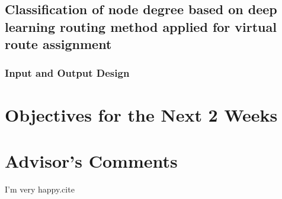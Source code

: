 \documentclass[11pt]{report}
\begin{document}
	\subsection{Classification of node degree based on deep learning routing method applied for virtual route assignment}
	
	\subsubsection{Input and Output Design}
	
	\section{Objectives for the Next 2 Weeks}
	
	
	\section{Advisor's Comments}
	

	I'm very happy.cite \cite{IEEEexample:IEEEwebsite}
	
	
	
	
\end{document}
